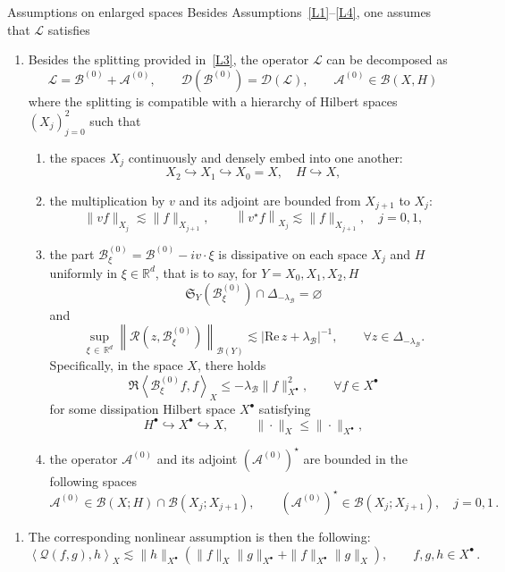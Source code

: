 \documentclass[10pt]{amsart}
\theoremstyle{definition}\newtheorem{defi}[theo]{Definition}\newtheorem{rema}[theo]{Remark}\newtheorem{exam}[theo]{Example}\newtheorem{exem}[theo]{Example}\newtheorem{nota}[theo]{Notation}
\newcommand{\re}{\mathrm{Re}\,}
\newcommand{\R}{\mathbb{R}}
\newcommand{\fkS}{\mathfrak{S}}
\renewcommand{\AA}{\mathcal{A}}
\newcommand{\BB}{\mathcal{B}}
\newcommand{\LL}{\mathcal{L}}
\newcommand{\QQ}{\mathcal{Q}}
\newcommand{\RR}{\mathcal{R}}
\newcommand{\dom}{\mathscr{D}}
\newcommand{\BBB}{\mathscr{B}}
\newcommand{\Ss}{H}
\newcommand{\Ssp}{H^{\bullet}}
\newcommand{\Sl}{X}
\newcommand{\Slp}{X^{\bullet}}
\newcommand{\Sg}{Y}
\renewcommand*\le{\leqslant}
\newcommand{\hypst}[1]{\textnormal{\textbf{#1}}}
\newcommand{\lla}{\left\langle}
\newcommand{\rra}{\right\rangle}
\let\oldforall\forall
\renewcommand*{\forall}{\mathrel{\oldforall}}
\begin{document}
\begin{enonce*}{Assumptions on enlarged spaces}
Besides Assumptions~\eqref{L1}--\eqref{L4}, one assumes that $\LL$ satisfies
\begin{enumerate}[label=\hypst{LE}]
\item \label{LE}
Besides the splitting provided in~\eqref{L3}, the operator $\LL$ can be decomposed as
\[
\LL = \BB^{(0)}+ \AA^{(0)}, \qquad \dom\left(\BB^{(0)}\right)=\dom(\LL), \qquad \AA^{(0)} \in \BBB(\Sl,\Ss)
\]
where the splitting is compatible with a hierarchy of Hilbert spaces $\left(\Sl_j\right)_{j=0}^{2}$ such that
\begin{enumerate}
\item the spaces $\Sl_j$ continuously and densely embed into one another:
\[
\Sl_{2} \hookrightarrow \Sl_{1} \hookrightarrow \Sl_{0} =\Sl, \quad \Ss \hookrightarrow \Sl,
\]
\item \label{assumption_large_multi-v}
the multiplication by $v$ and its adjoint are bounded from $\Sl_{j+1}$ to $\Sl_{j}$:
\begin{equation*}
\|v f\|_{\Sl_{j}} \lesssim \|f\|_{\Sl_{j+1}}, \qquad
\left\|v^{\star} f\right\|_{\Sl_{j}} \lesssim \|f\|_{\Sl_{j+1}}, \quad j=0,1,
\end{equation*}
\item the part $\BB^{(0)}_{\xi} = \BB^{(0)} - i v \cdot \xi$ is dissipative on each space $\Sl_j$ and $\Ss$ uniformly in $\xi \in \R^d$, that is to say, for $\Sg = \Sl_0, \Sl_1, \Sl_2, \Ss$
\[
\fkS_\Sg\left(\BB_{\xi}^{(0)} \right) \cap \Delta_{-\lambda_\BB} = \varnothing
\]
and
\[
\sup_{\xi\,\in\,\R^d}\left\|\RR\left(z,\BB^{(0)}_{\xi} \right)\right\|_{\BBB(\Sg)} \lesssim | \re z + \lambda_\BB|^{-1}, \qquad \forall z \in \Delta_{-\lambda_\BB}.
\]
Specifically, in the space $\Sl$, there holds
\[
\Re \lla \BB^{(0)}_{\xi} f, f \rra_{\Sl} \le - \lambda_\BB \| f \|_{\Slp}^2, \qquad \forall f \in \Slp
\]
for some dissipation Hilbert space $\Slp$ satisfying
\[
\Ssp \hookrightarrow \Slp \hookrightarrow \Sl, \qquad \| \cdot \|_{\Sl} \le \| \cdot \|_{\Slp},
\]
\item \label{assumption_large_bounded_A}
the operator $\AA^{(0)}$ and its adjoint $(\AA^{(0)})^{\star}$ are bounded in the following spaces
\[
\AA^{(0)} \in \BBB(\Sl;\Ss) \cap \BBB\left(\Sl_{j};\Sl_{j+1}\right), \qquad \left(\AA^{(0)}\right)^{\star} \in \BBB\left(\Sl_{j};\Sl_{j+1}\right), \quad j=0,1\,.
\]
\end{enumerate}
\end{enumerate}
\begin{enumerate}[label=\hypst{BE}]
\item \label{BE}
The corresponding nonlinear assumption is then the following:
\[
\lla \QQ(f, g), h \rra_{\Sl} \lesssim \| h \|_{\Slp} \left(\| f \|_{\Sl} \| g \|_{\Slp} + \| f \|_{\Slp} \| g \|_{\Sl} \right), \qquad f,g,h \in \Slp\,.
\]
\end{enumerate}
\end{enonce*}
\end{document}
